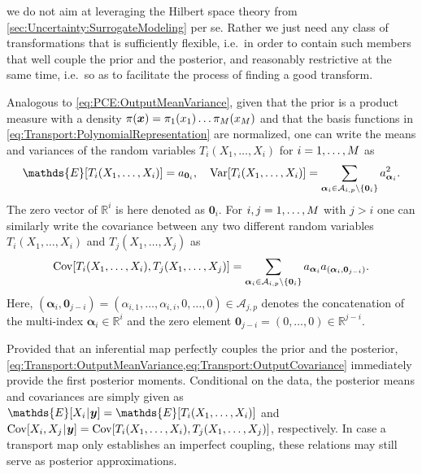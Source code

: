 we do not aim at leveraging the Hilbert space theory from \cref{sec:Uncertainty:SurrogateModeling} per se.
Rather we just need any class of transformations that is sufficiently flexible, i.e.\ in order to contain such members that well couple the prior and the posterior,
and reasonably restrictive at the same time, i.e.\ so as to facilitate the process of finding a good transform.
\par %
Analogous to \cref{eq:PCE:OutputMeanVariance}, given that the prior is a product measure with a density \(\pi(\bm{x}) = \pi_1(x_1) \ldots \pi_M(x_M)\)
and that the basis functions in \cref{eq:Transport:PolynomialRepresentation} are normalized,
one can write the means and variances of the random variables \(T_i(X_1,\ldots,X_i)\) for \(i = 1,\ldots,M\) as
\begin{equation} \label{eq:Transport:OutputMeanVariance}
  \mathds{E}[T_i(X_1,\ldots,X_i)] = \coeffM_{\bm{0}_i}, \quad
  \mathrm{Var}[T_i(X_1,\ldots,X_i)] = \sum_{\bm{\alpha}_i \in \mathcal{A}_{i,p} \setminus \{\bm{0}_i\}} \coeffM_{\bm{\alpha}_i}^2.
\end{equation}
The zero vector of \(\mathds{R}^i\) is here denoted as \(\bm{0}_i\).
For \(i,j = 1,\ldots,M\) with \(j > i\) one can similarly write the covariance between any two different random variables \(T_i(X_1,\ldots,X_i)\) and \(T_j(X_1,\ldots,X_j)\) as
\begin{equation} \label{eq:Transport:OutputCovariance}
  \mathrm{Cov}[T_i(X_1,\ldots,X_i),T_j(X_1,\ldots,X_j)] = \sum_{\bm{\alpha}_i \in \mathcal{A}_{i,p} \setminus \{\bm{0}_i\}} a_{\bm{\alpha}_i} a_{(\bm{\alpha}_i,\bm{0}_{j-i})}.
\end{equation}
Here, \((\bm{\alpha}_i,\bm{0}_{j-i}) = (\alpha_{i,1},\ldots,\alpha_{i,i},0,\ldots,0) \in \mathcal{A}_{j,p}\) denotes the concatenation
of the multi-index \(\bm{\alpha}_i \in \mathds{R}^i\) and the zero element \(\bm{0}_{j-i} = (0,\ldots,0) \in \mathds{R}^{j-i}\).
\par %
Provided that an inferential map perfectly couples the prior and the posterior, \cref{eq:Transport:OutputMeanVariance,eq:Transport:OutputCovariance} immediately provide the first posterior moments.
Conditional on the data, the posterior means and covariances are simply given as \(\mathds{E}[X_i \cond \bm{y}] = \mathds{E}[T_i(X_1,\ldots,X_i)]\)
and \(\mathrm{Cov}[X_i,X_j {\:\!}|{\:\!} \bm{y}] = \mathrm{Cov}[T_i(X_1,\ldots,X_i),T_j(X_1,\ldots,X_j)]\), respectively.
In case a transport map only establishes an imperfect coupling, these relations may still serve as posterior approximations.

